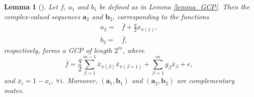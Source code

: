 \documentclass[pdflatex,sn-mathphys-num]{sn-jnl}%
\theoremstyle{thmstyleone}
\newtheorem{lemma}{Lemma}
\begin{document}
	\begin{lemma}[\cite{RathinaCCC}]\label{lemma_mate}
		Let $f$, $a_1$ and $b_1$ be defined as in Lemma \ref{lemma_GCP}. Then the complex-valued sequences $\mathbf{a}_2$ and $\mathbf{b}_2$, corresponding to the functions 
		\begin{equation}
			\begin{split}
				a_2=& \bar{f} + \frac{q}{2} x_{\pi(1)},\\
				b_2=&\bar{f},
			\end{split}
		\end{equation}
		respectively, forms a GCP of length $2^m$, where
		\begin{equation}
			\bar{f}= \frac{q}{2} \sum_{\beta=1}^{m-1} \bar{x}_{\pi(\beta)} \bar{x}_{\pi(\beta+1)} +\sum_{\beta=1}^{m} g_\beta \bar{x}_\beta +e,
		\end{equation}
		and $\bar{x}_i= 1-x_i$, $\forall i$. Moreover, $(\mathbf{a}_1, \mathbf{b}_1)$ and $(\mathbf{a}_2, \mathbf{b}_2)$ are complementary mates.
	\end{lemma}
	
\end{document}
